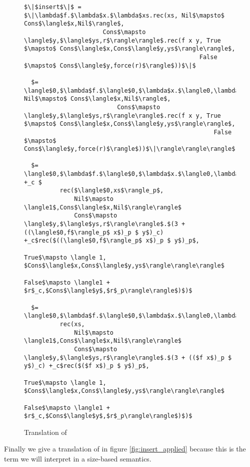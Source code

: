\begin{figure}[H]
\caption{Translation of }
\label{fig:insert}
\begin{lstlisting}
$\|$insert$\|$ = $\|\lambda$f.$\lambda$x.$\lambda$xs.rec(xs, Nil$\mapsto$ Cons$\langle$x,Nil$\rangle$,
                      Cons$\mapsto \langle$y,$\langle$ys,r$\rangle\rangle$.rec(f x y, True $\mapsto$ Cons$\langle$x,Cons$\langle$y,ys$\rangle\rangle$,
                                                 False $\mapsto$ Cons$\langle$y,force(r)$\rangle$))$\|$

  $= \langle$0,$\lambda$f.$\langle$0,$\lambda$x.$\langle0,\lambda$xs.$\|$rec(xs, Nil$\mapsto$ Cons$\langle$x,Nil$\rangle$,
                          Cons$\mapsto \langle$y,$\langle$ys,r$\rangle\rangle$.rec(f x y, True $\mapsto$ Cons$\langle$x,Cons$\langle$y,ys$\rangle\rangle$,
                                                     False $\mapsto$ Cons$\langle$y,force(r)$\rangle$))$\|\rangle\rangle\rangle$

  $= \langle$0,$\lambda$f.$\langle$0,$\lambda$x.$\langle0,\lambda$xs.$\langle$0,xs$\rangle_c +_c $
          rec($\langle$0,xs$\rangle_p$,
              Nil$\mapsto \langle1$,Cons$\langle$x,Nil$\rangle\rangle$
              Cons$\mapsto \langle$y,$\langle$ys,r$\rangle\rangle$.$(3 + ((\langle$0,f$\rangle_p$ x$)_p $ y$)_c) +_c$rec($((\langle$0,f$\rangle_p$ x$)_p $ y$)_p$,
                                                   True$\mapsto \langle 1, $Cons$\langle$x,Cons$\langle$y,ys$\rangle\rangle\rangle$
                                                   False$\mapsto \langle1 + $r$_c,$Cons$\langle$y$,$r$_p\rangle\rangle$)$)$

  $= \langle$0,$\lambda$f.$\langle$0,$\lambda$x.$\langle0,\lambda$xs.
          rec(xs,
              Nil$\mapsto \langle1$,Cons$\langle$x,Nil$\rangle\rangle$
              Cons$\mapsto \langle$y,$\langle$ys,r$\rangle\rangle$.$(3 + (($f x$)_p $ y$)_c) +_c$rec($($f x$)_p $ y$)_p$,
                                                 True$\mapsto \langle 1, $Cons$\langle$x,Cons$\langle$y,ys$\rangle\rangle\rangle$
                                                 False$\mapsto \langle1 + $r$_c,$Cons$\langle$y$,$r$_p\rangle\rangle$)$)$
\end{lstlisting}
\end{figure}
%
Finally we give a translation of  in figure
\ref{fig:insert_applied} because this is the term we will interpret in a
size-based semantics.
%
